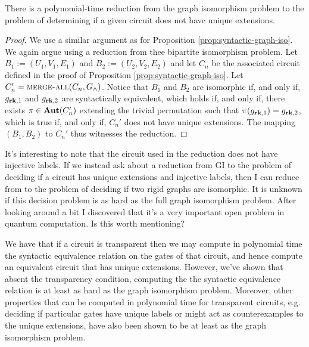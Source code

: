 \documentclass[../paper.tex]{subfiles}
\begin{document}
\begin{lem}
  There is a polynomial-time reduction from the graph isomorphism problem to the
  problem of determining if a given circuit does not have unique extensions.
  \label{lem:unique-extensions-hard}
\end{lem}
\begin{proof}
  We use a similar argument as for Proposition \ref{prop:syntactic-graph-iso}.
  We again argue using a reduction from thee bipartite isomorphism problem. Let
  $B_1 := (U_1, V_1, E_1)$ and $B_2 := (U_2, V_2, E_2)$ and let $C_n$ be the
  associated circuit defined in the proof of Proposition
  \ref{prop:syntactic-graph-iso}. Let $C_n' = {\normalfont\textsc{merge-all}} (C_n, G_{\land})$.
  Notice that $B_1$ and $B_2$ are isomorphic if, and only if, $g_{\text{\textbf{rk}}, 1}$ and
  $g_{\text{\textbf{rk}}, 2}$ are syntactically equivalent, which holds if, and only if,
  there exists $\pi \in \text{\textbf{Aut}}(C_n')$ extending the trivial permutation such that
  $\pi (g_{\text{\textbf{rk}}, 1}) = g_{\text{\textbf{rk}}, 2}$, which is true if, and only if, $C_n'$
  does not have unique extensions. The mapping $(B_1, B_2)$ to $C_n'$ thus
  witnesses the reduction.
\end{proof}

\begin{remark}
  It's interesting to note that the circuit used in the reduction does not have
  injective labels. If we instead ask about a reduction from GI to the problem
  of deciding if a circuit has unique extensions and injective labels, then I
  can reduce from to the problem of deciding if two rigid graphs are isomorphic.
  It is unknown if this decision problem is as hard as the full graph
  isomorphism problem. After looking around a bit I discovered that it's a very
  important open problem in quantum computation. Is this worth mentioning?
\end{remark}

We have that if a circuit is transparent then we may compute in polynomial time
the syntactic equivalence relation on the gates of that circuit, and hence
compute an equivalent circuit that has unique extensions. However, we've shown
that absent the transparency condition, computing the the syntactic equivalence
relation is at least as hard as the graph isomorphism problem. Moreover, other
properties that can be computed in polynomial time for transparent circuits,
e.g. deciding if particular gates have unique labels or might act as
counterexamples to the unique extensions, have also been shown to be at least as
the graph isomorphism problem.
\end{document}
